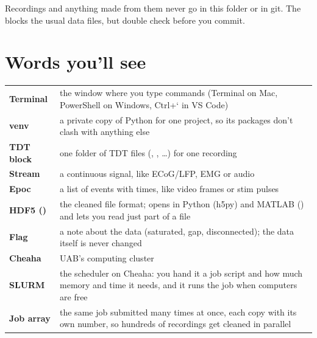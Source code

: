 \medskip
Recordings and anything made from them never go in this folder or in git. The  blocks the usual data files, but double check before you commit.

\section{Words you'll see}

\begin{tabularx}{\textwidth}{@{}>{\bfseries}l Y@{}}
Terminal & the window where you type commands (Terminal on Mac, PowerShell on Windows, Ctrl+` in VS Code) \\
venv & a private copy of Python for one project, so its packages don't clash with anything else \\
TDT block & one folder of TDT files (, , \ldots) for one recording \\
Stream & a continuous signal, like ECoG/LFP, EMG or audio \\
Epoc & a list of events with times, like video frames or stim pulses \\
HDF5 () & the cleaned file format; opens in Python (h5py) and MATLAB () and lets you read just part of a file \\
Flag & a note about the data (saturated, gap, disconnected); the data itself is never changed \\
Cheaha & UAB's computing cluster \\
SLURM & the scheduler on Cheaha: you hand it a job script and how much memory and time it needs, and it runs the job when computers are free \\
Job array & the same job submitted many times at once, each copy with its own number, so hundreds of recordings get cleaned in parallel \\
\end{tabularx}


